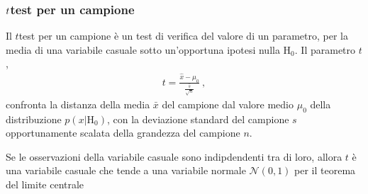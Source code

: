 \documentclass[letterpaper,10pt,italian]{jupyterBook}
\begin{document}
\subsubsection{\protect\(t\protect\)\sphinxhyphen{}test per un campione}
\label{\detokenize{ch/statistics/t-test:t-test-per-un-campione}}
\sphinxAtStartPar
Il \(t\)\sphinxhyphen{}test per un campione è un test di verifica del valore di un parametro, per la media di una variabile casuale sotto un’opportuna ipotesi nulla \(\text{H}_0\). Il parametro \(t\),
\begin{equation*}
\begin{split}t = \frac{\hat{x} - \mu_0}{\frac{\hat{s}}{\sqrt{n}}} \ ,\end{split}
\end{equation*}
\sphinxAtStartPar
confronta la distanza della media \(\bar{x}\) del campione dal valore medio \(\mu_0\) della distribuzione \(p(x|\text{H}_0)\), con la deviazione standard del campione \(s\) opportunamente scalata della grandezza del campione \(n\).

\sphinxAtStartPar
Se le osservazioni della variabile casuale sono indipdendenti tra di loro, allora \(t\) è una variabile casuale che tende a una variabile normale \(\mathscr{N}(0,1)\) per il teorema del limite centrale  
\end{document}
